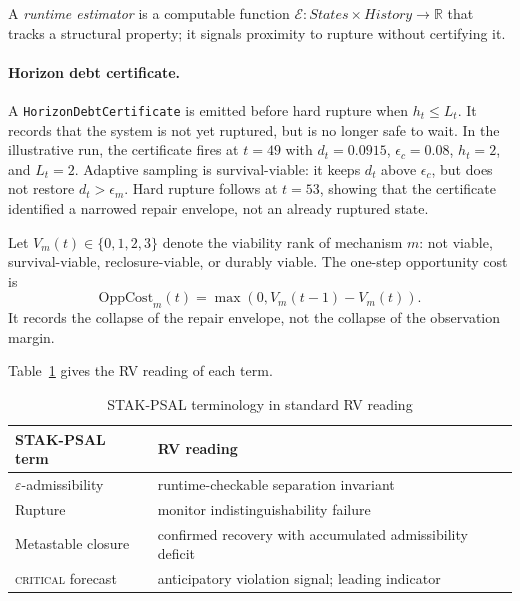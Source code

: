 \documentclass{llncs}
\newcommand{\st}[1]{\textup{\textsc{#1}}}
\begin{document}
\begin{definition}
\label{def:estimator}
A \emph{runtime estimator} is a computable function
$\mathcal{E} : \mathit{States} \times \mathit{History} \to \mathbb{R}$
that tracks a structural property; it signals proximity to rupture
without certifying it.
\end{definition}

\paragraph{Horizon debt certificate.}
A \texttt{HorizonDebtCertificate} is emitted before hard rupture when \(h_t\leq L_t\). It records that the system is not yet ruptured, but is no longer safe to wait. In the illustrative run, the certificate fires at \(t=49\) with \(d_t=0.0915\), \(\epsilon_c=0.08\), \(h_t=2\), and \(L_t=2\). Adaptive sampling is survival-viable: it keeps \(d_t\) above \(\epsilon_c\), but does not restore \(d_t>\epsilon_m\). Hard rupture follows at \(t=53\), showing that the certificate identified a narrowed repair envelope, not an already ruptured state.

Let \(V_m(t)\in\{0,1,2,3\}\) denote the viability rank of mechanism \(m\): not viable, survival-viable, reclosure-viable, or durably viable. The one-step opportunity cost is
\[
\mathrm{OppCost}_m(t)=\max(0,V_m(t-1)-V_m(t)).
\]
It records the collapse of the repair envelope, not the collapse of the observation margin.

Table~\ref{tab:vocab} gives the RV reading of each term.

\begin{table}[H]
\centering
\caption{STAK-PSAL terminology in standard RV reading}
\label{tab:vocab}
\small
\begin{tabular}{ll}
\toprule
\textbf{STAK-PSAL term} & \textbf{RV reading} \\
\midrule
$\varepsilon$-admissibility  & runtime-checkable separation invariant \\
Rupture                      & monitor indistinguishability failure \\
Metastable closure           & confirmed recovery with accumulated admissibility deficit \\
\st{critical} forecast       & anticipatory violation signal; leading indicator \\
\bottomrule
\end{tabular}
\end{table}
\end{document}
